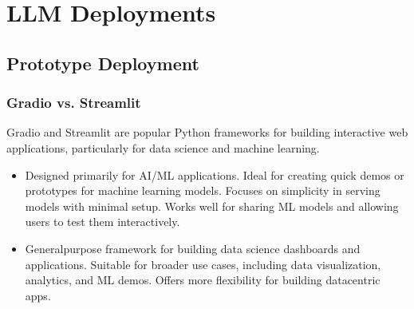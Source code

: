 \documentclass[letterpaper,11pt,english]{sphinxmanual}
\begin{document}
\sphinxstepscope


\chapter{LLM Deployments}
\label{\detokenize{deploy:llm-deployments}}\label{\detokenize{deploy:deploy}}\label{\detokenize{deploy::doc}}

\section{Prototype Deployment}
\label{\detokenize{deploy:prototype-deployment}}

\subsection{Gradio vs. Streamlit}
\label{\detokenize{deploy:gradio-vs-streamlit}}
\sphinxAtStartPar
Gradio and Streamlit are popular Python frameworks for building interactive web applications,
particularly for data science and machine learning.
\begin{itemize}
\item {} 
\sphinxAtStartPar
{}
\sphinxhyphen{} Designed primarily for AI/ML applications.
\sphinxhyphen{} Ideal for creating quick demos or prototypes for machine learning models.
\sphinxhyphen{} Focuses on simplicity in serving models with minimal setup.
\sphinxhyphen{} Works well for sharing ML models and allowing users to test them interactively.

\item {} 
\sphinxAtStartPar
{}
\sphinxhyphen{} General\sphinxhyphen{}purpose framework for building data science dashboards and applications.
\sphinxhyphen{} Suitable for broader use cases, including data visualization, analytics, and ML demos.
\sphinxhyphen{} Offers more flexibility for building data\sphinxhyphen{}centric apps.

\end{itemize}
\end{document}
